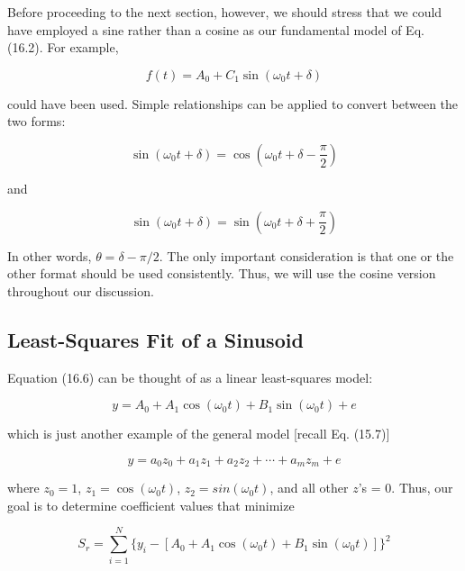 \documentclass[../main.tex]{subfiles}
\begin{document}
Before proceeding to the next section, however, we should stress that we could have
employed a sine rather than a cosine as our fundamental model of Eq. (16.2). For example,

\begin{equation}
	f(t) = A_0 + C_1 \sin(\omega_0 t + \delta)
\end{equation}

\noindent could have been used. Simple relationships can be applied to convert between the two forms:

\begin{equation}
	\sin(\omega_0 t + \delta) = \cos(\omega_0 t + \delta - \frac{\pi}{2})
\end{equation}

\noindent and

\begin{equation}
	\tag{16.10}
	\sin(\omega_0 t + \delta) = \sin(\omega_0 t + \delta + \frac{\pi}{2})
\end{equation}

\noindent In other words, $\theta = \delta - \pi/2$. The only important consideration is that one or the other format
should be used consistently. Thus, we will use the cosine version throughout our discussion.

\label{cha:cha_P_16_1_1}
\subsection{Least-Squares Fit of a Sinusoid}

\noindent Equation (16.6) can be thought of as a linear least-squares model:

\begin{equation}
	\tag{16.11}
	y = A_0 + A_1 \cos(\omega_0 t) + B_1 \sin(\omega_0 t) + e
\end{equation}

\noindent which is just another example of the general model [recall Eq. (15.7)]

\begin{equation}
	y = a_0 z_0 + a_1 z_1 + a_2 z_2 + \cdots + a_m z_m + e
\end{equation}

\noindent where $z_0 = 1$, $z_1 = \cos(\omega_0 t)$, $z_2 = sin(\omega_0 t)$, and all other $z$'s = 0. Thus, our goal is to determine coefficient values that minimize

\begin{equation}
	S_r = \sum ^ N _ {i=1} \{ y_i - [A_0 + A_1 \cos(\omega_0 t) + B_1 \sin(\omega_0 t)]\}^2
\end{equation}
\end{document}
